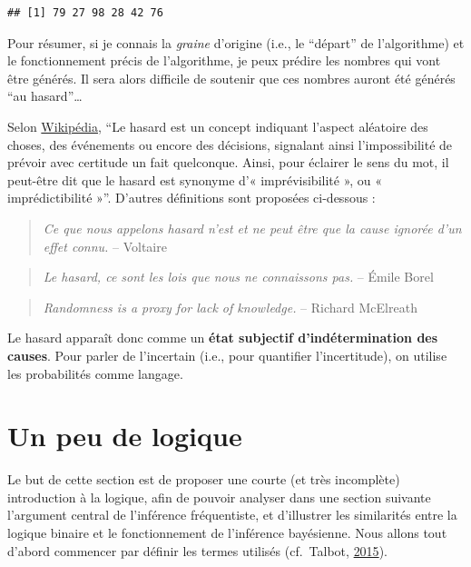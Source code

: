 \documentclass[
  a4paper,11pt,twoside,onecolumn,openright,final,oldfontcommands]{memoir}
\theoremstyle{definition}
\theoremstyle{definition}
\theoremstyle{definition}
\theoremstyle{remark}
\begin{document}
\begin{verbatim}
## [1] 79 27 98 28 42 76
\end{verbatim}

Pour résumer, si je connais la \emph{graine} d'origine (i.e., le ``départ'' de l'algorithme) et le fonctionnement précis de l'algorithme, je peux prédire les nombres qui vont être générés. Il sera alors difficile de soutenir que ces nombres auront été générés ``au hasard''\ldots{}

Selon \href{https://fr.wikipedia.org/wiki/Hasard}{Wikipédia}, ``Le hasard est un concept indiquant l'aspect aléatoire des choses, des événements ou encore des décisions, signalant ainsi l'impossibilité de prévoir avec certitude un fait quelconque. Ainsi, pour éclairer le sens du mot, il peut-être dit que le hasard est synonyme d'« imprévisibilité », ou « imprédictibilité »''. D'autres définitions sont proposées ci-dessous :

\begin{quote}
\emph{Ce que nous appelons hasard n'est et ne peut être que la cause ignorée d'un effet connu.} -- Voltaire
\end{quote}

\begin{quote}
\emph{Le hasard, ce sont les lois que nous ne connaissons pas.} -- Émile Borel
\end{quote}

\begin{quote}
\emph{Randomness is a proxy for lack of knowledge.} -- Richard McElreath
\end{quote}

Le hasard apparaît donc comme un \textbf{état subjectif d'indétermination des causes}. Pour parler de l'incertain (i.e., pour quantifier l'incertitude), on utilise les probabilités comme langage.

\hypertarget{un-peu-de-logique}{%
\section{Un peu de logique}\label{un-peu-de-logique}}

Le but de cette section est de proposer une courte (et très incomplète) introduction à la logique, afin de pouvoir analyser dans une section suivante l'argument central de l'inférence fréquentiste, et d'illustrer les similarités entre la logique binaire et le fonctionnement de l'inférence bayésienne. Nous allons tout d'abord commencer par définir les termes utilisés (cf.~Talbot, \protect\hyperlink{ref-talbot_critical_2015}{2015}).
\end{document}
